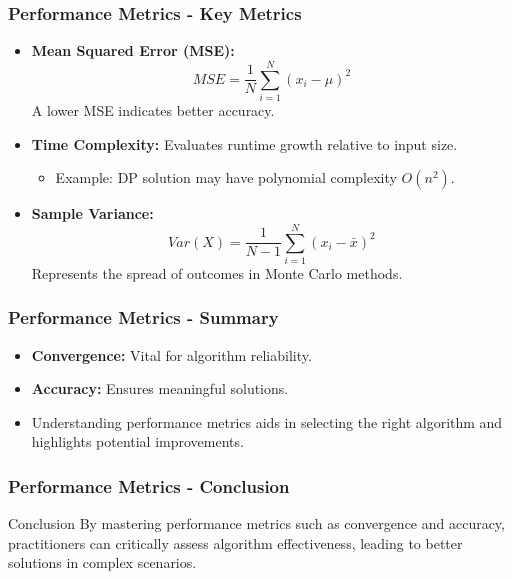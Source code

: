 \documentclass[aspectratio=169]{beamer}
\begin{document}
\begin{frame}[fragile]
    \frametitle{Performance Metrics - Key Metrics}
    \begin{itemize}
        \item \textbf{Mean Squared Error (MSE):}
        \begin{equation}
            MSE = \frac{1}{N} \sum_{i=1}^{N} (x_i - \mu)^2
        \end{equation}
        A lower MSE indicates better accuracy.

        \item \textbf{Time Complexity:} Evaluates runtime growth relative to input size.
        \begin{itemize}
            \item Example: DP solution may have polynomial complexity \(O(n^2)\).
        \end{itemize}

        \item \textbf{Sample Variance:}
        \begin{equation}
            Var(X) = \frac{1}{N-1} \sum_{i=1}^{N} (x_i - \bar{x})^2
        \end{equation}
        Represents the spread of outcomes in Monte Carlo methods.
    \end{itemize}
\end{frame}

\begin{frame}[fragile]
    \frametitle{Performance Metrics - Summary}
    \begin{itemize}
        \item \textbf{Convergence:} Vital for algorithm reliability.
        \item \textbf{Accuracy:} Ensures meaningful solutions.
        \item Understanding performance metrics aids in selecting the right algorithm and highlights potential improvements.
    \end{itemize}
\end{frame}

\begin{frame}[fragile]
    \frametitle{Performance Metrics - Conclusion}
    \begin{block}{Conclusion}
        By mastering performance metrics such as convergence and accuracy, practitioners can critically assess algorithm effectiveness, leading to better solutions in complex scenarios.
    \end{block}
\end{frame}
\end{document}
